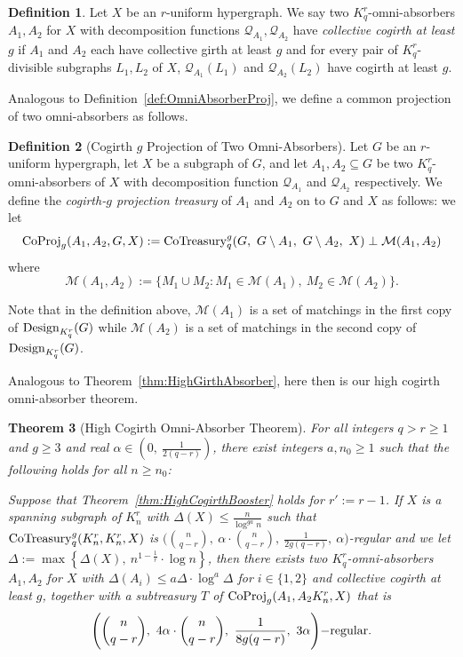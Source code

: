 \documentclass[11pt]{article}
\newcommand{\mc}[1]{\mathcal{#1}}
\newcounter{i}
\theoremstyle{plain}
\newtheorem{thm}{Theorem}[section]
\theoremstyle{plain} %
\theoremstyle{definition}
\newtheorem{definition}[thm]{Definition}
\begin{document}
\begin{definition}\label{def:OmniAbsorberCollectiveCogirth}
Let $X$ be an $r$-uniform hypergraph. We say two $K_q^r$-omni-absorbers $A_1,A_2$ for $X$ with decomposition functions $\mathcal{Q}_{A_1}, \mc{Q}_{A_2}$ have \emph{collective cogirth at least $g$} if $A_1$ and $A_2$ each have collective girth at least $g$ and for every pair of $K_q^r$-divisible subgraphs $L_1,L_2$ of $X$, $\mathcal{Q}_{A_1}(L_1)$ and $\mathcal{Q}_{A_2}(L_2)$ have cogirth at least $g$. 
\end{definition}

Analogous to Definition~\ref{def:OmniAbsorberProj}, we define a common projection of two omni-absorbers as follows.

\begin{definition}[Cogirth $g$ Projection of Two Omni-Absorbers]\label{def:OmniAbsorberCoProj}
Let $G$ be an $r$-uniform hypergraph, let $X$ be a subgraph of $G$, and let $A_1,A_2\subseteq G$ be two $K_q^r$-omni-absorbers of $X$ with decomposition function $\mathcal{Q}_{A_1}$ and $\mc{Q}_{A_2}$ respectively. We define the \emph{cogirth-$g$ projection treasury} of $A_1$ and $A_2$ on to $G$ and $X$ as follows: we let
$${\rm CoProj}_g(A_1,A_2,G,X):= {\rm CoTreasury}_q^g(G,~G\setminus A_1,~G\setminus A_2,~X)  \perp \mathcal{M}(A_1,A_2)$$
where
$$\mathcal{M}(A_1,A_2) := \{ M_1\cup M_2: M_1\in \mc{M}(A_1),~M_2\in \mc{M}(A_2)\}.$$
\end{definition}
Note that in the definition above, $\mc{M}(A_1)$ is a set of matchings in the first copy of ${\rm Design}_{K_q^r}(G)$ while $\mc{M}(A_2)$ is a set of matchings in the second copy of ${\rm Design}_{K_q^r}(G)$.


Analogous to Theorem~\ref{thm:HighGirthAbsorber}, here then is our high cogirth omni-absorber theorem.

\begin{thm}[High Cogirth Omni-Absorber Theorem]\label{thm:HighCogirthAbsorber}
For all integers $q>r\ge 1$ and $g\ge 3$ and real $\alpha \in \left(0,~\frac{1}{2(q-r)}\right)$, there exist integers $a,n_0\ge 1$ such that the following holds for all $n\ge n_0$: 

Suppose that Theorem~\ref{thm:HighCogirthBooster} holds for $r':=r-1$. If $X$ is a spanning subgraph of $K_n^r$ with $\Delta(X) \le \frac{n}{\log^{ga} n}$ such that ${\rm CoTreasury}^g_q(K_n^r,K_n^r,X)$ is $\bigg(\binom{n}{q-r},~\alpha\cdot \binom{n}{q-r},~\frac{1}{2g(q-r)},~\alpha\bigg)$-regular and we let $\Delta:= \max\left\{ \Delta(X),~n^{1-\frac{1}{r}}\cdot \log n\right\}$, then there exists two $K_q^r$-omni-absorbers $A_1,A_2$ for $X$ with $\Delta(A_i)\le a\Delta\cdot \log^{a} \Delta$ for $i\in \{1,2\}$ and collective cogirth at least $g$, together with a subtreasury $T$ of ${\rm CoProj}_g(A_1,A_2 K_n^r, X)$ that is 
$$\Bigg(\binom{n}{q-r},~4\alpha \cdot \binom{n}{q-r},~\frac{1}{8g(q-r)},~3\alpha\Bigg){\rm - regular}.$$
\end{thm}
\end{document}
